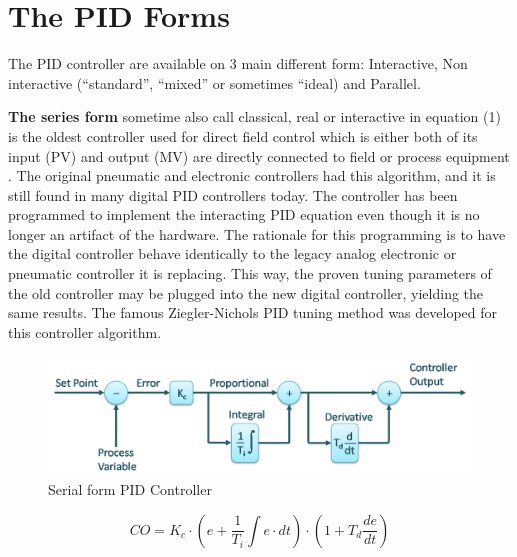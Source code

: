 \section{The PID Forms}

The PID controller are available on 3 main different form: Interactive, Non interactive (“standard”, “mixed” or sometimes “ideal) and Parallel.  

\textbf{The series form} sometime also call classical, real or interactive in equation (1) is the oldest controller used for direct field control which is either both of its input (PV) and output (MV) are directly connected to field or process equipment \cite{Wolfgang}. The original pneumatic and electronic controllers had this algorithm, and it is still found in many digital PID controllers today. The controller has been programmed to implement the interacting PID equation even though it is no longer an artifact of the hardware. The rationale for this programming is to have the digital controller behave identically to the legacy analog electronic or pneumatic controller it is replacing. This way, the proven tuning parameters of the old controller may be plugged into the new digital controller, yielding the same results.  
The famous Ziegler-Nichols PID tuning method was developed for this controller algorithm. 

\begin{figure}[H]
	\centering
	\includegraphics[width=0.8\columnwidth]{Pictures/series.png}
	\caption[Short title]{Serial form PID Controller \cite{PID}}
	\label{figure: Serial PID}
\end{figure}

\begin{equation}
\label{eqn:1}
    CO = K_c\cdot\left(e + \frac{1}{T_i}\int e\cdot dt \right)\cdot \left(1 + T_d\frac{de}{dt} \right)
\end{equation}



